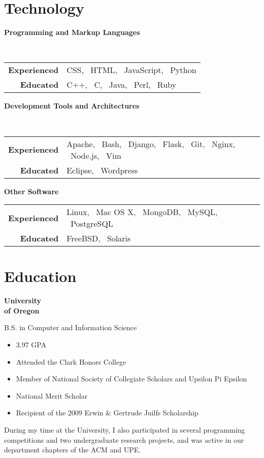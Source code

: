 \documentclass[10pt,letterpaper]{article}
\newenvironment{topic}[1]{
\begin{minipage}[t]{0.15\linewidth}\begin{flushleft}\begin{flushright}\textbf{#1}\end{flushright}\end{flushleft}\end{minipage}\hspace{1em}\vrule\hspace{1em}\begin{minipage}[t]{0.80\linewidth}\begin{flushright}\begin{flushleft}
}{
\end{flushleft}\end{flushright}\end{minipage}\vspace{1em}
}
\begin{document}
\section{Technology}
\begin{topic}{\textnormal{Programming and Markup Languages}} \hfill \\
  \begin{tabular}{r l}
    \textbf{Experienced} & CSS, \ HTML, \ JavaScript, \ Python \\
    \textbf{Educated} & C++, \ C, \ Java, \ Perl, \ Ruby
  \end{tabular}
  \newline
\end{topic}

\begin{topic}{\textnormal{Development Tools and Architectures}} \hfill \\
  \begin{tabular}{r l}
    \textbf{Experienced} & Apache, \ Bash, \ Django, \ Flask, \ Git, \ Nginx, \ Node.js, \ Vim \\
    \textbf{Educated} & Eclipse, \ Wordpress
  \end{tabular}
  \newline
\end{topic}

\begin{topic}{\textnormal{Other Software}}
  \begin{tabular}{r l}
    \textbf{Experienced} &  Linux, \ Mac OS X, \ MongoDB, \ MySQL, \ PostgreSQL \\
    \textbf{Educated} & FreeBSD, \ Solaris
  \end{tabular}
\end{topic}

\vspace{-1.5em}
\section{Education}
\begin{topic}{University \\ of Oregon}
  B.S. in Computer and Information Science
  \begin{itemize}
    \setlength{\itemsep}{0em}
    \setlength{\parskip}{0em}
    \item 3.97 GPA
    \item Attended the Clark Honors College
    \item Member of National Society of Collegiate Scholars and Upsilon Pi Epsilon
    \item National Merit Scholar
    \item Recipient of the 2009 Erwin \& Gertrude Juilfs Scholarship
  \end{itemize}
  During my time at the University, I also participated in several programming competitions
  and two undergraduate research projects, and was active in our department chapters of the
  ACM and UPE.
\end{topic}
\end{document}
